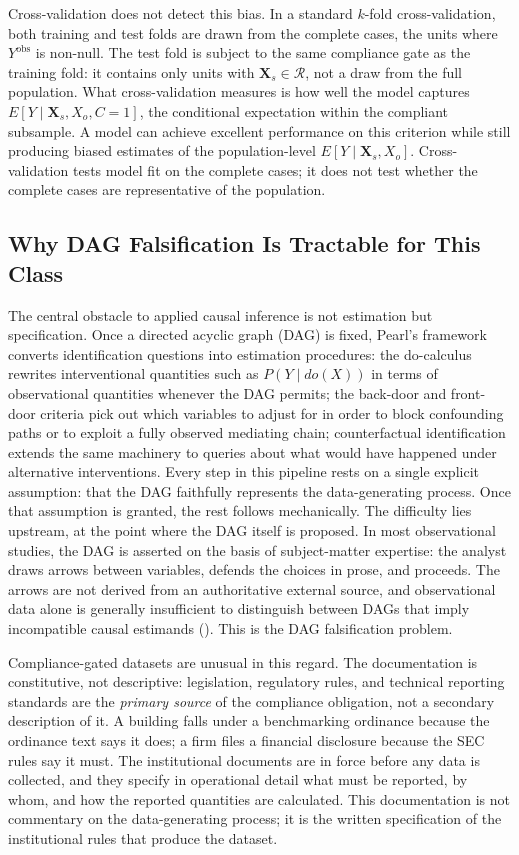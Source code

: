 Cross-validation does not detect this bias. In a standard $k$-fold cross-validation, both training and test folds are drawn from the complete cases, the units where $Y^{\text{obs}}$ is non-null. The test fold is subject to the same compliance gate as the training fold: it contains only units with $\mathbf{X}_s \in \mathcal{R}$, not a draw from the full population. What cross-validation measures is how well the model captures $E[Y \mid \mathbf{X}_s, X_o, C = 1]$, the conditional expectation within the compliant subsample. A model can achieve excellent performance on this criterion while still producing biased estimates of the population-level $E[Y \mid \mathbf{X}_s, X_o]$. Cross-validation tests model fit on the complete cases; it does not test whether the complete cases are representative of the population.

\subsection{Why DAG Falsification Is Tractable for This Class}

The central obstacle to applied causal inference is not estimation but specification. Once a directed acyclic graph (DAG) is fixed, Pearl's framework converts identification questions into estimation procedures: the do-calculus rewrites interventional quantities such as $P(Y \mid do(X))$ in terms of observational quantities whenever the DAG permits; the back-door and front-door criteria pick out which variables to adjust for in order to block confounding paths or to exploit a fully observed mediating chain; counterfactual identification extends the same machinery to queries about what would have happened under alternative interventions. Every step in this pipeline rests on a single explicit assumption: that the DAG faithfully represents the data-generating process. Once that assumption is granted, the rest follows mechanically. The difficulty lies upstream, at the point where the DAG itself is proposed. In most observational studies, the DAG is asserted on the basis of subject-matter expertise: the analyst draws arrows between variables, defends the choices in prose, and proceeds. The arrows are not derived from an authoritative external source, and observational data alone is generally insufficient to distinguish between DAGs that imply incompatible causal estimands (). This is the DAG falsification problem.

Compliance-gated datasets are unusual in this regard. The documentation is constitutive, not descriptive: legislation, regulatory rules, and technical reporting standards are the \textit{primary source} of the compliance obligation, not a secondary description of it. A building falls under a benchmarking ordinance because the ordinance text says it does; a firm files a financial disclosure because the SEC rules say it must. The institutional documents are in force before any data is collected, and they specify in operational detail what must be reported, by whom, and how the reported quantities are calculated. This documentation is not commentary on the data-generating process; it is the written specification of the institutional rules that produce the dataset.

